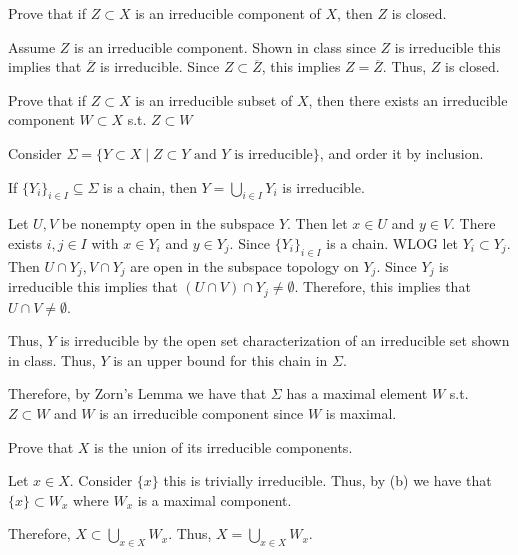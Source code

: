 \documentclass[12pt, letterpaper]{article}
\renewcommand{\t}[1]{\text{#1}}
\begin{document}
\begin{subproblem}{}
    Prove that if $Z \subset X$ is an irreducible component of $X$, then $Z$ is closed.
\end{subproblem}
\begin{problemproof}
    Assume $Z$ is an irreducible component. Shown in class since $Z$ is irreducible this implies that $\overline{Z}$ is irreducible. Since $Z \subset \overline{Z}$, this implies $Z=\overline{Z}$. Thus, $Z$ is closed.
\end{problemproof}

\begin{subproblem}{}
    Prove that if $Z \subset X$ is an irreducible subset of $X$, then there exists an irreducible component $W \subset X$ s.t. $Z \subset W$
\end{subproblem}
\begin{problemproof}
    Consider $\Sigma=\{Y \subset X \mid Z \subset Y \t{ and } Y \t{ is irreducible}\}$, and order it by inclusion.

    If $\{Y_i\}_{i \in I} \subseteq \Sigma$ is a chain, then $Y=\bigcup_{i \in I} Y_i$ is irreducible.

    Let $U,V$ be nonempty open in the subspace $Y$. Then let $x \in U$ and $y \in V$. There exists $i,j \in I$ with $x \in Y_i$ and $y \in Y_j$. Since $\{Y_i\}_{i \in I}$ is a chain. WLOG let $Y_i \subset Y_j$. Then $U\cap Y_j, V \cap Y_j$ are open in the subspace topology on $Y_j$. Since $Y_j$ is irreducible this implies that $(U \cap V) \cap Y_j \neq \emptyset$. Therefore, this implies that $U \cap V \neq \emptyset$.

    Thus, $Y$ is irreducible by the open set characterization of an irreducible set shown in class. Thus, $Y$ is an upper bound for this chain in $\Sigma$.
    
    Therefore, by Zorn's Lemma we have that $\Sigma$ has a maximal element $W$ s.t. $Z \subset W$ and $W$ is an irreducible component since $W$ is maximal.
\end{problemproof}

\begin{subproblem}{}
    Prove that $X$ is the union of its irreducible components.
\end{subproblem}
\begin{problemproof}
    Let $x \in X$. Consider $\{x\}$ this is trivially irreducible. Thus, by (b) we have that $\{x\} \subset W_x$ where $W_x$ is a maximal component.
    
    Therefore, $X \subset \bigcup_{x \in X}W_x$. Thus, $X= \bigcup_{x \in X}W_x$.
\end{problemproof}
\end{document}

